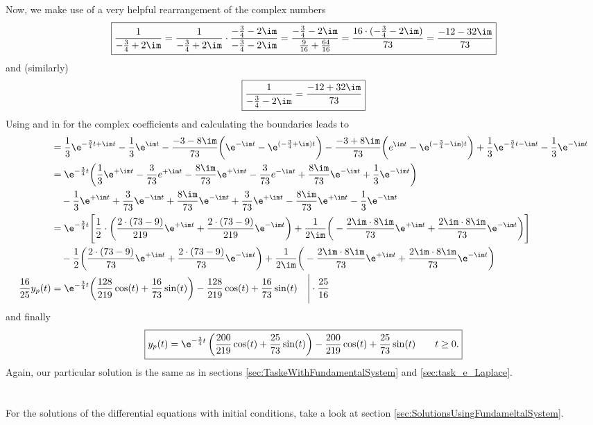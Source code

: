Now, we make use of a very helpful rearrangement of the complex numbers
\begin{align}
	\label{eq:helpfulCalculation}
	\boxed{\frac{1}{-\frac{3}{4}+2\im}=\frac{1}{-\frac{3}{4}+2\im} \cdot \frac{-\frac{3}{4}-2\im}{-\frac{3}{4}-2\im}=\frac{-\frac{3}{4}-2\im}{\frac{9}{16}+\frac{64}{16}}=\frac{16\cdot (-\frac{3}{4}-2\im)}{73}=\frac{-12-32\im}{73}}
\end{align}
and (similarly)
\begin{align}
	\label{eq:helpfulCalculationAnalog}
	\boxed{\frac{1}{-\frac{3}{4}-2\im}=\frac{-12+32\im}{73}}
\end{align}
Using  and  in  for the complex coefficients and calculating the boundaries leads to
\begin{align}
	&= \frac{1}{3}\e^{-\frac{3}{4}t+\im t}-\frac{1}{3}\e^{\im t}-\frac{-3-8\im}{73}\bigg (\e^{-\im t}-\e^{(-\frac{3}{4}+\im)t}\bigg )-\frac{-3+8\im}{73}\bigg (e^{\im t}-\e^{(-\frac{3}{4}-\im)t}\bigg )+\frac{1}{3}\e^{-\frac{3}{4}t-\im t}-\frac{1}{3}\e^{-\im t} \nonumber \\
	&=\e^{-\frac{3}{4}t}\bigg (\frac{1}{3}\e^{+\im t} -\frac{3}{73}e^{+\im t}-\frac{8\im}{73}\e^{+\im t}-\frac{3}{73}e^{-\im t}+\frac{8\im}{73}\e^{-\im t}+\frac{1}{3}\e^{-\im t}\bigg )\nonumber \\
	&\quad -\frac{1}{3}\e^{+\im t}+\frac{3}{73}\e^{-\im t}+\frac{8\im}{73}\e^{-\im t}+\frac{3}{73}\e^{+\im t}-\frac{8\im}{73}\e^{+\im t}-\frac{1}{3}\e^{-\im t} \nonumber \\
	&=\e^{-\frac{3}{4}t}\Bigg[\frac{1}{2}\cdot\bigg (\frac{2\cdot(73-9)}{219}\e^{+\im t}+\frac{2\cdot(73-9)}{219}\e^{-\im t}\bigg ) + \frac{1}{2\im} \bigg (-\frac{2\im \cdot 8 \im}{73}\e^{+\im t}+\frac{2\im \cdot 8 \im}{73}\e^{-\im t} \bigg ) \Bigg ] \nonumber \\
	&\quad-\frac{1}{2} \bigg (\frac{2\cdot(73-9)}{73}\e^{+\im t}+\frac{2\cdot(73-9)}{73}\e^{-\im t} \bigg ) +\frac{1}{2\im}\bigg (-\frac{2\im\cdot 8 \im}{73}\e^{+\im t}+\frac{2\im\cdot 8 \im}{73}\e^{-\im t}\bigg ) \nonumber \\
	\frac{16}{25}y_p(t)&=\e^{-\frac{3}{4}t}\bigg (\frac{128}{219}\cos (t)+\frac{16}{73}\sin (t)\bigg )-\frac{128}{219}\cos (t)+\frac{16}{73}\sin (t) \quad \Bigg | \cdot \frac{25}{16} \nonumber
\end{align}
and finally
\begin{align}
\boxed{
y_p(t) = \e^{-\frac{3}{4}t}\left(\frac{200}{219}\cos (t)+\frac{25}{73}\sin (t)\right)-\frac{200}{219}\cos (t)+\frac{25}{73}\sin (t)\qquad t\geq 0.
}
\end{align}
Again, our particular solution is the same as in sections \ref{sec:TaskeWithFundamentalSystem} and \ref{sec:task_e_Laplace}.
\\
\\
\\
For the solutions of the differential equations with initial conditions, take a look at section \ref{sec:SolutionsUsingFundameltalSystem}.
\newpage
